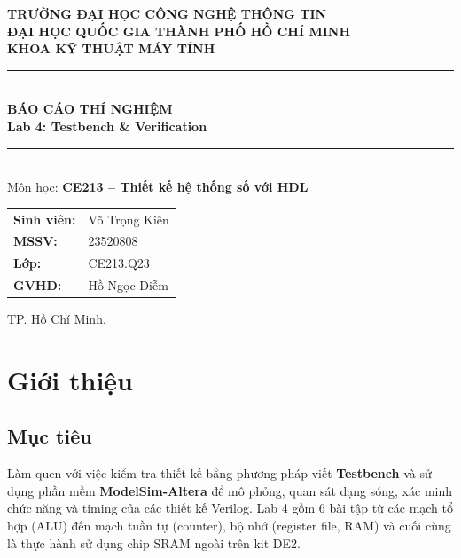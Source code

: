 \documentclass[12pt,a4paper]{article}
\begin{document}
\begin{titlepage}
\centering
\vspace*{1cm}

{\Large\textbf{TRƯỜNG ĐẠI HỌC CÔNG NGHỆ THÔNG TIN}}\\[0.3cm]
{\Large\textbf{ĐẠI HỌC QUỐC GIA THÀNH PHỐ HỒ CHÍ MINH}}\\[0.3cm]
{\large\textbf{KHOA KỸ THUẬT MÁY TÍNH}}\\[2cm]

\rule{\textwidth}{1.5pt}\\[0.5cm]
{\LARGE\bfseries BÁO CÁO THÍ NGHIỆM}\\[0.3cm]
{\Huge\bfseries Lab 4: Testbench \& Verification}\\[0.5cm]
\rule{\textwidth}{1.5pt}\\[1.5cm]

{\large Môn học: \textbf{CE213 -- Thiết kế hệ thống số với HDL}}\\[1cm]

\begin{tabular}{ll}
    \textbf{Sinh viên:}  & Võ Trọng Kiên \\
    \textbf{MSSV:}        & 23520808 \\
    \textbf{Lớp:}         & CE213.Q23 \\
    \textbf{GVHD:}        & Hồ Ngọc Diễm \\
\end{tabular}

\vfill

{\large TP. Hồ Chí Minh, \the\year}
\end{titlepage}

\tableofcontents
\newpage

\section{Giới thiệu}

\subsection{Mục tiêu}
Làm quen với việc kiểm tra thiết kế bằng phương pháp viết \textbf{Testbench} và sử dụng phần mềm \textbf{ModelSim-Altera} để mô phỏng, quan sát dạng sóng, xác minh chức năng và timing của các thiết kế Verilog. Lab 4 gồm 6 bài tập từ các mạch tổ hợp (ALU) đến mạch tuần tự (counter), bộ nhớ (register file, RAM) và cuối cùng là thực hành sử dụng chip SRAM ngoài trên kit DE2.
\end{document}
